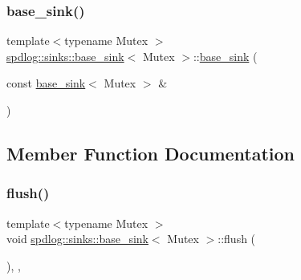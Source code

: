 \mbox{\label{classspdlog_1_1sinks_1_1base__sink_a9639062f2ce3598203c0d958576491d1}} 
\subsubsection{\texorpdfstring{base\+\_\+sink()}{base\_sink()}\hspace{0.1cm}{\footnotesize\ttfamily [2/2]}}
{\footnotesize\ttfamily template$<$typename Mutex $>$ \\
\hyperlink{classspdlog_1_1sinks_1_1base__sink}{spdlog\+::sinks\+::base\+\_\+sink}$<$ Mutex $>$\+::\hyperlink{classspdlog_1_1sinks_1_1base__sink}{base\+\_\+sink} (\begin{DoxyParamCaption}\item[{const \hyperlink{classspdlog_1_1sinks_1_1base__sink}{base\+\_\+sink}$<$ Mutex $>$ \&}]{ }\end{DoxyParamCaption})\hspace{0.3cm}{\ttfamily [delete]}}



\subsection{Member Function Documentation}
\mbox{\label{classspdlog_1_1sinks_1_1base__sink_a2de93f1edc37e891555685ed4e520343}} 
\subsubsection{\texorpdfstring{flush()}{flush()}}
{\footnotesize\ttfamily template$<$typename Mutex $>$ \\
void \hyperlink{classspdlog_1_1sinks_1_1base__sink}{spdlog\+::sinks\+::base\+\_\+sink}$<$ Mutex $>$\+::flush (\begin{DoxyParamCaption}{ }\end{DoxyParamCaption})\hspace{0.3cm}{\ttfamily [inline]}, {\ttfamily [final]}, {\ttfamily [virtual]}}




